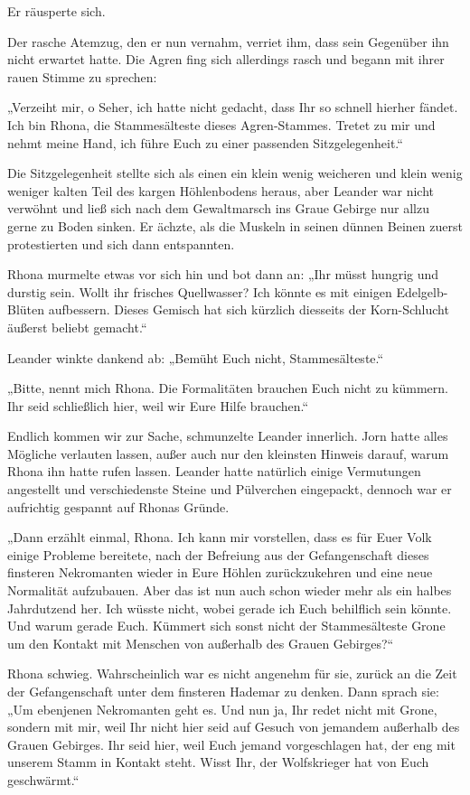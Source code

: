 \documentclass[10pt, a4paper, oneside]{book}
\begin{document}
Er räusperte sich.

Der rasche Atemzug, den er nun vernahm, verriet ihm, dass sein Gegenüber ihn nicht erwartet hatte. Die Agren fing sich allerdings rasch und begann mit ihrer rauen Stimme zu sprechen:

„Verzeiht mir, o Seher, ich hatte nicht gedacht, dass Ihr so schnell hierher fändet. Ich bin Rhona, die Stammesälteste dieses Agren-Stammes. Tretet zu mir und nehmt meine Hand, ich führe Euch zu einer passenden Sitzgelegenheit.“

Die Sitzgelegenheit stellte sich als einen ein klein wenig weicheren und klein wenig weniger kalten Teil des kargen Höhlenbodens heraus, aber Leander war nicht verwöhnt und ließ sich nach dem Gewaltmarsch ins Graue Gebirge nur allzu gerne zu Boden sinken. Er ächzte, als die Muskeln in seinen dünnen Beinen zuerst protestierten und sich dann entspannten.

Rhona murmelte etwas vor sich hin und bot dann an: „Ihr müsst hungrig und durstig sein. Wollt ihr frisches Quellwasser? Ich könnte es mit einigen Edelgelb-Blüten aufbessern. Dieses Gemisch hat sich kürzlich diesseits der Korn-Schlucht äußerst beliebt gemacht.“

Leander winkte dankend ab: „Bemüht Euch nicht, Stammesälteste.“

„Bitte, nennt mich Rhona. Die Formalitäten brauchen Euch nicht zu kümmern. Ihr seid schließlich hier, weil wir Eure Hilfe brauchen.“

Endlich kommen wir zur Sache, schmunzelte Leander innerlich. Jorn hatte alles Mögliche verlauten lassen, außer auch nur den kleinsten Hinweis darauf, warum Rhona ihn hatte rufen lassen. Leander hatte natürlich einige Vermutungen angestellt und verschiedenste Steine und Pülverchen eingepackt, dennoch war er aufrichtig gespannt auf Rhonas Gründe.

„Dann erzählt einmal, Rhona. Ich kann mir vorstellen, dass es für Euer Volk einige Probleme bereitete, nach der Befreiung aus der Gefangenschaft dieses finsteren Nekromanten wieder in Eure Höhlen zurückzukehren und eine neue Normalität aufzubauen. Aber das ist nun auch schon wieder mehr als ein halbes Jahrdutzend her. Ich wüsste nicht, wobei gerade ich Euch behilflich sein könnte. Und warum gerade Euch. Kümmert sich sonst nicht der Stammesälteste Grone um den Kontakt mit Menschen von außerhalb des Grauen Gebirges?“

Rhona schwieg. Wahrscheinlich war es nicht angenehm für sie, zurück an die Zeit der Gefangenschaft unter dem finsteren Hademar zu denken. Dann sprach sie: „Um ebenjenen Nekromanten geht es. Und nun ja, Ihr redet nicht mit Grone, sondern mit mir, weil Ihr nicht hier seid auf Gesuch von jemandem außerhalb des Grauen Gebirges. Ihr seid hier, weil Euch jemand vorgeschlagen hat, der eng mit unserem Stamm in Kontakt steht. Wisst Ihr, der Wolfskrieger hat von Euch geschwärmt.“
\end{document}

